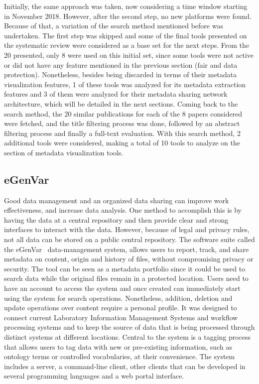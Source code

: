 Initially, the same approach was taken, now considering a time window starting in November 2018.
However, after the second step, no new platforms were found.
Because of that, a variation of the search method mentioned before was undertaken.
The first step was skipped and some of the final tools presented on the systematic review were considered as a base set for the next steps.
From the 20 presented, only 8 were used on this initial set, since some tools were not active or did not have any feature mentioned in the previous section (\gls{fair} and data protection).
Nonetheless, besides being discarded in terms of their metadata visualization features, 1 of these tools was analyzed for its metadata extraction features and 3 of them were analyzed for their metadata sharing network architecture, which will be detailed in the next sections.
Coming back to the search method, the 20 similar publications for each of the 8 papers considered were fetched, and the title filtering process was done, followed by an abstract filtering process and finally a full-text evaluation.
With this search method, 2 additional tools were considered, making a total of 10 tools to analyze on the section of metadata visualization tools.

\subsection*{eGenVar}

Good data management and an organized data sharing can improve work effectiveness, and increase data analysis.
One method to accomplish this is by having the data at a central repository and then provide clear and strong interfaces to interact with the data.
However, because of legal and privacy rules, not all data can be stored on a public central repository.
The software suite called the eGenVar~\cite{egenvar} data-management system, allows users to report, track, and share metadata on content, origin and history of files, without compromising privacy or security.
The tool can be seen as a metadata portfolio since it could be used to search data while the original files remain in a protected location.
Users need to have an account to access the system and once created can immediately start using the system for search operations.
Nonetheless, addition, deletion and update operations over content require a personal profile.
It was designed to connect current Laboratory Information Management Systems and workflow processing systems and to keep the source of data that is being processed through distinct systems at different locations.
Central to the system is a tagging process that allows users to tag data with new or pre-existing information, such as ontology terms or controlled vocabularies, at their convenience.
The system includes a server, a command-line client, other clients that can be developed in several programming languages and a web portal interface.

